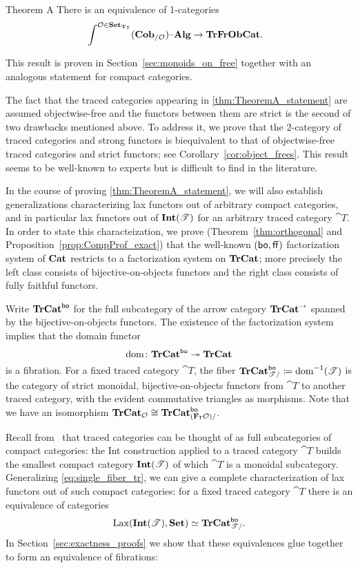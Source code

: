 \documentclass[11pt,oneside,article]{memoir}
\begin{document}
\begin{named}{Theorem A}
    \label{thm:TheoremA_statement}
  There is an equivalence of 1-categories
  \begin{align*}
    &\int^{\mathcal{O}\in\mathbf{Set}_{\mathbf{T}_{\mathsf{T}}}}(\mathbf{Cob}_{/\mathcal{O}}){\text \textendash}\mathbf{Alg} \to \mathbf{TrFrObCat}.
  \end{align*}
\end{named}

This result is proven in Section~\ref{sec:monoids_on_free} together with an analogous statement for
compact categories.

The fact that the traced categories appearing in \ref{thm:TheoremA_statement} are assumed
objectwise-free and the functors between them are strict is the second of two drawbacks mentioned
above. To address it, we prove that the 2-category of traced categories and strong functors is
biequivalent to that of objectwise-free traced categories and strict functors; see
Corollary~\ref{cor:object_frees}. This result seems to be well-known to experts but is difficult to
find in the literature.

In the course of proving \ref{thm:TheoremA_statement}, we will also establish generalizations
characterizing lax functors out of arbitrary compact categories, and in particular lax functors out
of $\mathbf{Int}(\mathscr{T})$ for an arbitrary traced category $\cat{T}$. In order to state this
characteization, we prove (Theorem~\ref{thm:orthogonal} and Proposition~\ref{prop:CompProf_exact})
that the well-known $(\mathsf{bo},\mathsf{ff})$ factorization system of $\mathbf{Cat}$ restricts to a factorization system
on $\mathbf{TrCat}$; more precisely the left class consists of bijective-on-objects functors and the right
class consists of fully faithful functors.

Write $\mathbf{TrCat}^{\mathsf{bo}}$ for the full subcategory of the arrow category $\mathbf{TrCat}^{\to}$ spanned by the
bijective-on-objects functors. The existence of the factorization system implies that the domain
functor
\[
  \operatorname{dom}\colon\mathbf{TrCat}^{\mathsf{bo}}\twoheadrightarrow\mathbf{TrCat}
\]
is a fibration. For a fixed traced category $\cat{T}$, the fiber
$\mathbf{TrCat}^{\mathsf{bo}}_{\mathscr{T}/}\coloneqq\operatorname{dom}^{-1}(\mathscr{T})$ is the category of strict monoidal,
bijective-on-objects functors from $\cat{T}$ to another traced category, with the evident
commutative triangles as morphisms. Note that we have an isomorphism
$\mathbf{TrCat}_{\mathcal{O}}\cong\mathbf{TrCat}^{\mathsf{bo}}_{(\mathbf{F}_{\mathsf{T}}\mathcal{O})/}$.

Recall from~\cite{JoyalStreetVerity} that traced categories can be thought of as full subcategories
of compact categories: the Int construction applied to a traced category $\cat{T}$ builds the
smallest compact category $\mathbf{Int}(\mathscr{T})$ of which $\cat{T}$ is a monoidal subcategory. Generalizing
\eqref{eq:single_fiber_tr}, we can give a complete characterization of lax functors out of such
compact categories: for a fixed traced category $\cat{T}$ there is an equivalence of categories
\[
  \operatorname{Lax}(\mathbf{Int}(\mathscr{T}),\mathbf{Set})\simeq\mathbf{TrCat}^{\mathsf{bo}}_{\mathscr{T}/}.
\]
In Section~\ref{sec:exactness_proofs} we show that these equivalences glue together to form an
equivalence of fibrations:
\end{document}
